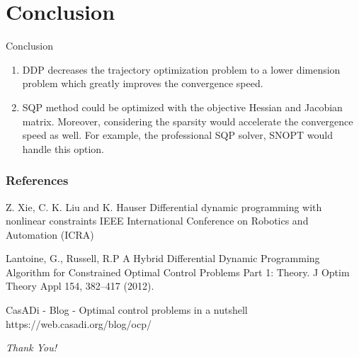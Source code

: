 \documentclass[10pt,compress]{beamer}
\begin{document}
\section{Conclusion}

\begin{frame}{Conclusion}
\begin{enumerate}
\item DDP decreases the trajectory optimization problem to a lower dimension problem which greatly improves the convergence speed. 
\item SQP method could be optimized with the objective Hessian and Jacobian matrix. Moreover, considering the sparsity would accelerate the convergence speed as well. For example, the professional SQP solver, SNOPT would handle this option. 
\end{enumerate}
\end{frame}



\begin{frame}
\frametitle{References}

\footnotesize{
\begin{thebibliography}{99} 

 Z. Xie, C. K. Liu and K. Hauser
\newblock Differential dynamic programming with nonlinear constraints
 IEEE International Conference on Robotics and Automation (ICRA)

 Lantoine, G., Russell, R.P
\newblock A Hybrid Differential Dynamic Programming Algorithm for Constrained Optimal Control Problems
\newblock Part 1: Theory. J Optim Theory Appl 154, 382–417 (2012). 

 CasADi - Blog - Optimal control problems in a nutshell
\newblock https://web.casadi.org/blog/ocp/
\end{thebibliography}
}
\end{frame}


\begin{frame}{}
  \centering \Huge
  \emph{Thank You!}
\end{frame}

\end{document}
